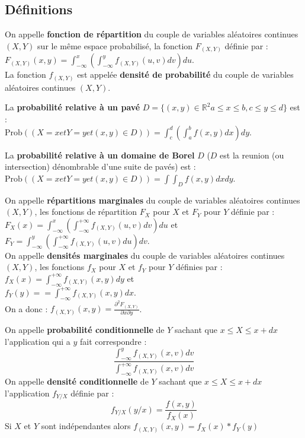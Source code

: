 \documentclass[a4paper,11pt]{book}
\newcommand{\R}{{\mathbb{R}}}
\begin{document}
\subsection{D\'efinitions}
On appelle {\bf fonction de r\'epartition} du couple de variables al\'eatoires 
continues $(X,Y)$ sur le m\^eme espace probabilis\'e, la fonction $F_{(X,Y)}$ 
d\'efinie par :\\
$\displaystyle F_{(X,Y)}(x,y)=\int_{-\infty}^x(\int_{-\infty}^yf_{(X,Y)}(u,v)dv)du$.\\
La fonction $f_{(X,Y)}$ est appel\'ee {\bf densit\'e de probabilit\'e} du couple de 
variables al\'eatoires continues $(X,Y)$.

La {\bf probabilit\'e relative \`a un pav\'e} 
$D=\{(x,y)\in \R^2 a\leq x \leq b,c\leq y \leq d \}$ est :\\
$\mbox{Prob}((X=x et Y=y et (x,y)\in D ))=\int_c^d(\int_a^b f(x,y)dx) dy$.

La {\bf probabilit\'e relative \`a un domaine de Borel} 
$D$ ($D$ est la reunion (ou intersection) d\'enombrable d'une suite de pav\'es)
est :\\
$\mbox{Prob}((X=x et Y=y et (x,y)\in D ))=\int\int_D f(x,y)dx dy$.

On appelle {\bf  r\'epartitions marginales} du couple de variables al\'eatoires
continues $(X,Y)$, les fonctions de r\'epartition $F_X$ pour $X$ et $F_Y$ pour $Y$ 
d\'efinie par :\\
$\displaystyle F_X(x)=\int_{-\infty}^x(\int_{-\infty}^{+\infty}f_{(X,Y)}(u,v)dv)du$ et\\
$\displaystyle F_Y=\int_{-\infty}^y(\int_{-\infty}^{+\infty}f_{(X,Y)}(u,v)du)dv$.\\
On appelle {\bf densit\'es marginales} du couple de variables 
al\'eatoires continues $(X,Y)$, les fonctions $f_X$ pour $X$ et $f_Y$ pour $Y$ 
d\'efinies par :\\
$\displaystyle f_X(x)=\int_{-\infty}^{+\infty}f_{(X,Y)}(x,y)dy$ et\\
$\displaystyle f_Y(y)==\int_{-\infty}^{+\infty}f_{(X,Y)}(x,y)dx$.\\
On a donc : $\displaystyle f_{(X,Y)}(x,y)=\frac{\partial^2F_{(X,Y)}}{\partial x \partial y}$.

On appelle {\bf probabilit\'e conditionnelle} de $Y$ sachant que 
$x\leq X\leq x+dx$ l'application qui a $y$ fait correspondre :
$$\displaystyle \frac{\int_{-\infty}^yf_{(X,Y)}(x,v)dv}{\int_{-\infty}^{+\infty}f_{(X,Y)}(x,v)dv}$$
On appelle {\bf densit\'e conditionnelle} de $Y$ sachant que 
$x\leq X\leq x+dx$ l'application $f_{Y/X}$ d\'efinie par :
$$\displaystyle f_{Y/X}(y/x)=\frac{f(x,y)}{f_X(x)}$$
Si $X$ et $Y$ sont ind\'ependantes alors $f_{(X,Y)}(x,y)=f_X(x)* f_Y(y)$
\end{document}
